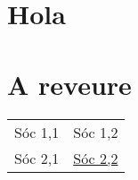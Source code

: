 \documentclass{article}
\begin{document}
\section{Hola}

\section{A reveure}

\colorbox{shade}{
\begin{supertabular}{p{0.5\linewidth}|p{0.5\linewidth}}
Sóc 1,1 & Sóc 1,2\\

Sóc 2,1 & \href{https://www.ctan.org/}{Sóc 2,2}
\\

\end{supertabular}
}
\end{document}
